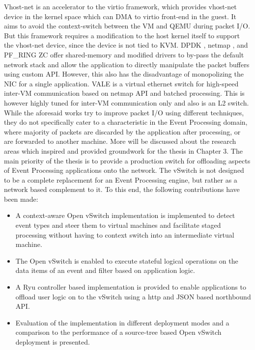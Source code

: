 Vhost-net is an accelerator to the virtio framework, which provides vhost-net device in the kernel space which can DMA to virtio front-end in the guest. It aims to avoid the context-switch between the VM and QEMU during packet I/O. But this framework requires a modification to the host kernel itself to support the vhost-net device, since the device is not tied to KVM.  DPDK \citep{scholz2014look}, netmap \cite{rizzo2012netmap}, and PF_RING ZC \cite{kim2017study} offer shared-memory and modified drivers to by-pass the default network stack and allow the application to directly manipulate the packet buffers using custom API. However, this also has the disadvantage of monopolizing the NIC for a single application. VALE \cite{Rizzo:2012:VSE:2413176.2413185} is a virtual ethernet switch for high-speed inter-VM communication based on netmap API and batched processing. This is however highly tuned for inter-VM communication only and also is an L2 switch. While the aforesaid works try to improve packet I/O using different techniques, they do not specifically cater to a characteristic in the Event Processing domain, where majority of packets are discarded by the application after processing, or are forwarded to another machine. More will be discussed about the research areas which inspired and provided groundwork for the thesis in Chapter 3.
\newline \newline
The main priority of the thesis is to provide a production switch for offloading aspects of Event Processing applications onto the network. The vSwitch is not designed to be a complete replacement for an Event Processing engine, but rather as a network based complement to it. To this end, the following contributions have been made:
\begin{itemize}
 \item A context-aware Open vSwitch implementation is implemented to detect event types and steer them to virtual machines and facilitate staged processing without having to context switch into an intermediate virtual machine.
 \item The Open vSwitch is enabled to execute stateful logical operations on the data items of an event and filter based on application logic. 
 \item A Ryu controller based implementation is provided to enable applications to offload user logic on to the vSwitch using a http and JSON based northbound API.
 \item Evaluation of the implementation in different deployment modes and a comparison to the performance of a source-tree based Open vSwitch deployment is presented.
\end{itemize} 


